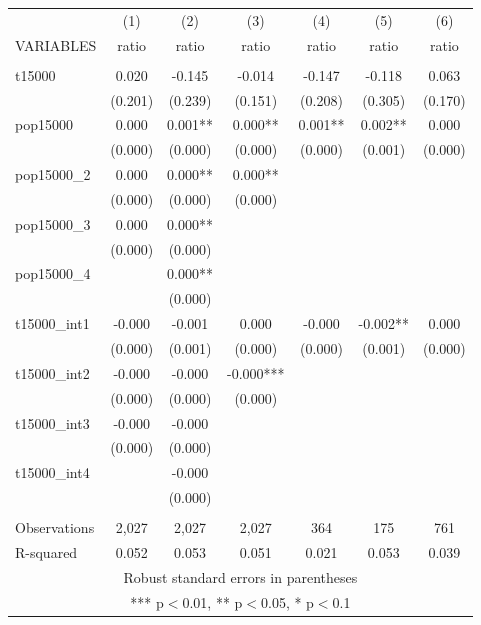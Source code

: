 \documentclass[]{article}
\begin{document}
\begin{tabular}{lcccccc} \hline
 & (1) & (2) & (3) & (4) & (5) & (6) \\
VARIABLES & ratio & ratio & ratio & ratio & ratio & ratio \\ \hline
 &  &  &  &  &  &  \\
t15000 & 0.020 & -0.145 & -0.014 & -0.147 & -0.118 & 0.063 \\
 & (0.201) & (0.239) & (0.151) & (0.208) & (0.305) & (0.170) \\
pop15000 & 0.000 & 0.001** & 0.000** & 0.001** & 0.002** & 0.000 \\
 & (0.000) & (0.000) & (0.000) & (0.000) & (0.001) & (0.000) \\
pop15000\_2 & 0.000 & 0.000** & 0.000** &  &  &  \\
 & (0.000) & (0.000) & (0.000) &  &  &  \\
pop15000\_3 & 0.000 & 0.000** &  &  &  &  \\
 & (0.000) & (0.000) &  &  &  &  \\
pop15000\_4 &  & 0.000** &  &  &  &  \\
 &  & (0.000) &  &  &  &  \\
t15000\_int1 & -0.000 & -0.001 & 0.000 & -0.000 & -0.002** & 0.000 \\
 & (0.000) & (0.001) & (0.000) & (0.000) & (0.001) & (0.000) \\
t15000\_int2 & -0.000 & -0.000 & -0.000*** &  &  &  \\
 & (0.000) & (0.000) & (0.000) &  &  &  \\
t15000\_int3 & -0.000 & -0.000 &  &  &  &  \\
 & (0.000) & (0.000) &  &  &  &  \\
t15000\_int4 &  & -0.000 &  &  &  &  \\
 &  & (0.000) &  &  &  &  \\
 &  &  &  &  &  &  \\
Observations & 2,027 & 2,027 & 2,027 & 364 & 175 & 761 \\
 R-squared & 0.052 & 0.053 & 0.051 & 0.021 & 0.053 & 0.039 \\ \hline
\multicolumn{7}{c}{ Robust standard errors in parentheses} \\
\multicolumn{7}{c}{ *** p$<$0.01, ** p$<$0.05, * p$<$0.1} \\
\end{tabular}
\end{document}
